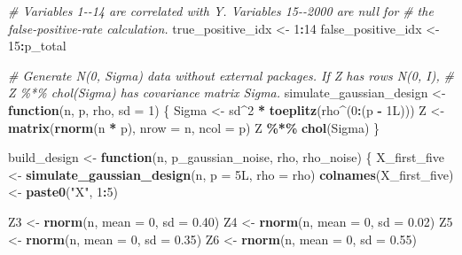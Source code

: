 \documentclass[
]{article}
\newenvironment{Shaded}{\begin{snugshade}}{\end{snugshade}}
\newcommand{\AttributeTok}[1]{\textcolor[rgb]{0.13,0.29,0.53}{#1}}
\newcommand{\CommentTok}[1]{\textcolor[rgb]{0.56,0.35,0.01}{\textit{#1}}}
\newcommand{\ControlFlowTok}[1]{\textcolor[rgb]{0.13,0.29,0.53}{\textbf{#1}}}
\newcommand{\DataTypeTok}[1]{\textcolor[rgb]{0.13,0.29,0.53}{#1}}
\newcommand{\DecValTok}[1]{\textcolor[rgb]{0.00,0.00,0.81}{#1}}
\newcommand{\FloatTok}[1]{\textcolor[rgb]{0.00,0.00,0.81}{#1}}
\newcommand{\FunctionTok}[1]{\textcolor[rgb]{0.13,0.29,0.53}{\textbf{#1}}}
\newcommand{\NormalTok}[1]{#1}
\newcommand{\OtherTok}[1]{\textcolor[rgb]{0.56,0.35,0.01}{#1}}
\newcommand{\SpecialCharTok}[1]{\textcolor[rgb]{0.81,0.36,0.00}{\textbf{#1}}}
\newcommand{\StringTok}[1]{\textcolor[rgb]{0.31,0.60,0.02}{#1}}
\begin{document}
\begin{Shaded}
\begin{Highlighting}[]
\CommentTok{\# Variables 1{-}{-}14 are correlated with Y. Variables 15{-}{-}2000 are null for}
\CommentTok{\# the false{-}positive{-}rate calculation.}
\NormalTok{true\_positive\_idx }\OtherTok{\textless{}{-}} \DecValTok{1}\SpecialCharTok{:}\DecValTok{14}
\NormalTok{false\_positive\_idx }\OtherTok{\textless{}{-}} \DecValTok{15}\SpecialCharTok{:}\NormalTok{p\_total}

\CommentTok{\# Generate N(0, Sigma) data without external packages. If Z has rows N(0, I),}
\CommentTok{\# Z \%*\% chol(Sigma) has covariance matrix Sigma.}
\NormalTok{simulate\_gaussian\_design }\OtherTok{\textless{}{-}} \ControlFlowTok{function}\NormalTok{(n, p, rho, }\AttributeTok{sd =} \DecValTok{1}\NormalTok{) \{}
\NormalTok{  Sigma }\OtherTok{\textless{}{-}}\NormalTok{ sd}\SpecialCharTok{\^{}}\DecValTok{2} \SpecialCharTok{*} \FunctionTok{toeplitz}\NormalTok{(rho}\SpecialCharTok{\^{}}\NormalTok{(}\DecValTok{0}\SpecialCharTok{:}\NormalTok{(p }\SpecialCharTok{{-}} \DecValTok{1}\DataTypeTok{L}\NormalTok{)))}
\NormalTok{  Z }\OtherTok{\textless{}{-}} \FunctionTok{matrix}\NormalTok{(}\FunctionTok{rnorm}\NormalTok{(n }\SpecialCharTok{*}\NormalTok{ p), }\AttributeTok{nrow =}\NormalTok{ n, }\AttributeTok{ncol =}\NormalTok{ p)}
\NormalTok{  Z }\SpecialCharTok{\%*\%} \FunctionTok{chol}\NormalTok{(Sigma)}
\NormalTok{\}}

\NormalTok{build\_design }\OtherTok{\textless{}{-}} \ControlFlowTok{function}\NormalTok{(n, p\_gaussian\_noise, rho, rho\_noise) \{}
\NormalTok{  X\_first\_five }\OtherTok{\textless{}{-}} \FunctionTok{simulate\_gaussian\_design}\NormalTok{(n, }\AttributeTok{p =} \DecValTok{5}\DataTypeTok{L}\NormalTok{, }\AttributeTok{rho =}\NormalTok{ rho)}
  \FunctionTok{colnames}\NormalTok{(X\_first\_five) }\OtherTok{\textless{}{-}} \FunctionTok{paste0}\NormalTok{(}\StringTok{"X"}\NormalTok{, }\DecValTok{1}\SpecialCharTok{:}\DecValTok{5}\NormalTok{)}

\NormalTok{  Z3 }\OtherTok{\textless{}{-}} \FunctionTok{rnorm}\NormalTok{(n, }\AttributeTok{mean =} \DecValTok{0}\NormalTok{, }\AttributeTok{sd =} \FloatTok{0.40}\NormalTok{)}
\NormalTok{  Z4 }\OtherTok{\textless{}{-}} \FunctionTok{rnorm}\NormalTok{(n, }\AttributeTok{mean =} \DecValTok{0}\NormalTok{, }\AttributeTok{sd =} \FloatTok{0.02}\NormalTok{)}
\NormalTok{  Z5 }\OtherTok{\textless{}{-}} \FunctionTok{rnorm}\NormalTok{(n, }\AttributeTok{mean =} \DecValTok{0}\NormalTok{, }\AttributeTok{sd =} \FloatTok{0.35}\NormalTok{)}
\NormalTok{  Z6 }\OtherTok{\textless{}{-}} \FunctionTok{rnorm}\NormalTok{(n, }\AttributeTok{mean =} \DecValTok{0}\NormalTok{, }\AttributeTok{sd =} \FloatTok{0.55}\NormalTok{)}


\end{Highlighting}
\end{Shaded}
\end{document}
